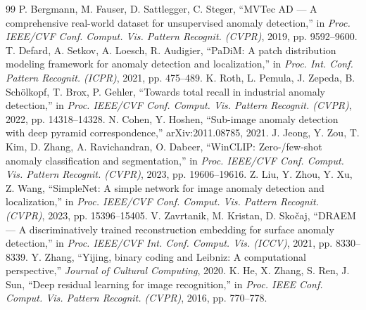 \documentclass[journal,10pt]{IEEEtran}
\begin{document}

\begin{thebibliography}{99}
 P. Bergmann, M. Fauser, D. Sattlegger, C. Steger,
``MVTec AD --- A comprehensive real-world dataset for unsupervised anomaly
detection,'' in \emph{Proc. IEEE/CVF Conf. Comput. Vis. Pattern Recognit.
(CVPR)}, 2019, pp. 9592--9600.
 T. Defard, A. Setkov, A. Loesch, R. Audigier, ``PaDiM:
A patch distribution modeling framework for anomaly detection and
localization,'' in \emph{Proc. Int. Conf. Pattern Recognit. (ICPR)}, 2021,
pp. 475--489.
 K. Roth, L. Pemula, J. Zepeda, B. Sch\"olkopf,
T. Brox, P. Gehler, ``Towards total recall in industrial anomaly detection,'' in
\emph{Proc. IEEE/CVF Conf. Comput. Vis. Pattern Recognit. (CVPR)}, 2022,
pp. 14318--14328.
 N. Cohen, Y. Hoshen, ``Sub-image anomaly detection with
deep pyramid correspondence,'' arXiv:2011.08785, 2021.
 J. Jeong, Y. Zou, T. Kim, D. Zhang, A. Ravichandran,
O. Dabeer, ``WinCLIP: Zero-/few-shot anomaly classification and segmentation,'' in
\emph{Proc. IEEE/CVF Conf. Comput. Vis. Pattern Recognit. (CVPR)}, 2023,
pp. 19606--19616.
 Z. Liu, Y. Zhou, Y. Xu, Z. Wang, ``SimpleNet: A simple
network for image anomaly detection and localization,'' in \emph{Proc.
IEEE/CVF Conf. Comput. Vis. Pattern Recognit. (CVPR)}, 2023, pp. 15396--15405.
 V. Zavrtanik, M. Kristan, D. Sko\v{c}aj, ``DRAEM ---
A discriminatively trained reconstruction embedding for surface anomaly
detection,'' in \emph{Proc. IEEE/CVF Int. Conf. Comput. Vis. (ICCV)}, 2021,
pp. 8330--8339.
 Y. Zhang, ``Yijing, binary coding and Leibniz: A
computational perspective,'' \emph{Journal of Cultural Computing}, 2020.
 K. He, X. Zhang, S. Ren, J. Sun, ``Deep residual learning
for image recognition,'' in \emph{Proc. IEEE Conf. Comput. Vis. Pattern
Recognit. (CVPR)}, 2016, pp. 770--778.
\end{thebibliography}
\end{document}
